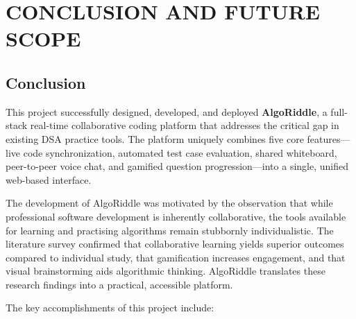 \chapter{CONCLUSION AND FUTURE SCOPE}

\section{Conclusion}

This project successfully designed, developed, and deployed \textbf{AlgoRiddle}, a full-stack real-time collaborative coding platform that addresses the critical gap in existing DSA practice tools. The platform uniquely combines five core features---live code synchronization, automated test case evaluation, shared whiteboard, peer-to-peer voice chat, and gamified question progression---into a single, unified web-based interface.

The development of AlgoRiddle was motivated by the observation that while professional software development is inherently collaborative, the tools available for learning and practising algorithms remain stubbornly individualistic. The literature survey confirmed that collaborative learning yields superior outcomes compared to individual study, that gamification increases engagement, and that visual brainstorming aids algorithmic thinking. AlgoRiddle translates these research findings into a practical, accessible platform.

The key accomplishments of this project include:

